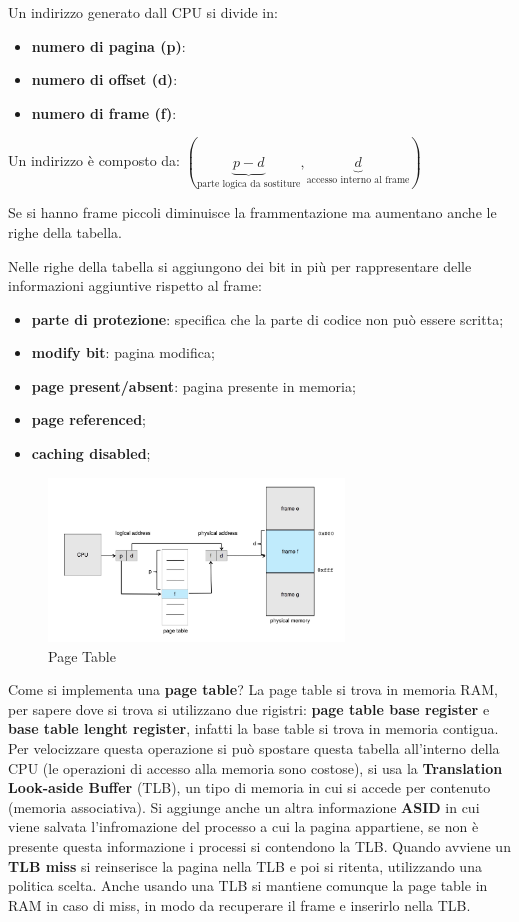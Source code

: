 \documentclass[12pt]{article}
\begin{document}
Un indirizzo generato dall CPU si divide in:
\begin{itemize}
  \item \textbf{numero di pagina (p)}: 
  \item \textbf{numero di offset (d)}:
  \item \textbf{numero di frame (f)}:
\end{itemize}
Un indirizzo \`e composto da: $(\underbrace{p-d}_\text{parte logica da sostiture}, \underbrace{d}_\text{accesso interno al frame})$
\begin{example}{}{}
  Se si hanno frame piccoli diminuisce la frammentazione ma aumentano anche le righe della tabella.
\end{example}
Nelle righe della tabella si aggiungono dei bit in pi\`u per rappresentare delle informazioni aggiuntive rispetto al frame:
\begin{itemize}
  \item \textbf{parte di protezione}: specifica che la parte di codice non pu\`o essere scritta;
  \item \textbf{modify bit}: pagina modifica;
  \item \textbf{page present/absent}:  pagina presente in memoria;
  \item \textbf{page referenced};
  \item \textbf{caching disabled};
\end{itemize}
\begin{figure}[H]
  \centering
  \includegraphics[width=0.7\textwidth]{page-table.png}
  \caption{Page Table}
  \label{fig:page-table}
\end{figure}
Come si implementa una \textbf{page table}? La page table si trova in memoria RAM, per sapere dove si trova si utilizzano due rigistri: \textbf{page table base register} e \textbf{base table lenght register}, infatti la base table si trova in memoria contigua. Per velocizzare questa operazione si pu\`o spostare questa tabella all'interno della CPU (le operazioni di accesso alla memoria sono costose), si usa la \textbf{Translation Look-aside Buffer} (TLB), un tipo di memoria in cui si accede per contenuto (memoria associativa). Si aggiunge anche un altra informazione \textbf{ASID} in cui viene salvata l'infromazione del processo a cui la pagina appartiene, se non \`e presente questa informazione i processi si contendono la TLB. Quando avviene un \textbf{TLB miss} si reinserisce la pagina nella TLB e poi si ritenta, utilizzando una politica scelta. Anche usando una TLB si mantiene comunque la page table in RAM in caso di miss, in modo da recuperare il frame e inserirlo nella TLB.
\end{document}
